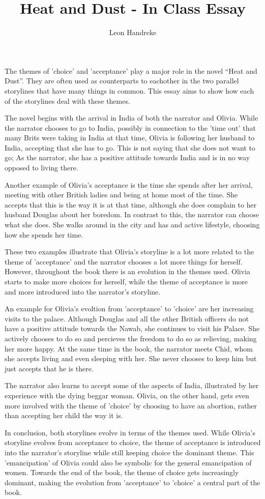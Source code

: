 \documentclass[11pt]{article}
\title{Heat and Dust - In Class Essay}
\author{Leon Handreke}
\date{}                                           %
\begin{document}
\doublespacing

\maketitle
{}\selectfont

The themes of 'choice' and 'acceptance' play a major role in the novel ``Heat and Dust''. They are often used as counterparts to eachother in the two parallel storylines that have many things in common. This essay aims to show how each of the storylines deal with these themes.

The novel begins with the arrival in India of both the narrator and Olivia. While the narrator chooses to go to India, possibly in connection to the 'time out' that many Brits were taking in India at that time, Olivia is following her husband to India, accepting that she has to go. This is not saying that she does not want to go; As the narrator, she has a positive attitude towards India and is in no way opposed to living there.

Another example of Olivia's acceptance is the time she spends after her arrival, meeting with other British ladies and being at home most of the time. She accepts that this is the way it is at that time, although she does complain to her husband Douglas about her boredom. In contrast to this, the narrator can choose what she does. She walks around in the city and has and active lifestyle, choosing how she spends her time.

These two examples illustrate that Olivia's storyline is a lot more related to the theme of 'acceptance' and the narrator chooses a lot more things for herself. However, throughout the book there is an evolution in the themes used. Olivia starts to make more choices for herself, while the theme of acceptance is more and more introduced into the narrator's storyline.

An example for Olivia's evoltion from 'acceptance' to 'choice' are her increasing visits to the palace. Although Douglas and all the other British officers do not have a positive attitude towards the Nawab, she continues to visit his Palace. She actively chooses to do so and percieves the freedom to do so as relieving, making her more happy. At the same time in the book, the narrator meets Chid, whom she accepts living and even sleeping with her. She never chooses to keep him but just accepts that he is there.

The narrator also learns to accept some of the aspects of India, illustrated by her experience with the dying beggar woman. Olivia, on the other hand, gets even more involved with the theme of 'choice' by choosing to have an abortion, rather than accepting her child the way it is.

In conclusion, both storylines evolve in terms of the themes used. While Olivia's storyline evolves from acceptance to choice, the theme of acceptance is introduced into the narrator's storyline while still keeping choice the dominant theme. This 'emancipation' of Olivia could also be symbolic for the general emancipation of women. Towards the end of the book, the theme of choice gets increasingly dominant, making the evolution from 'acceptance' to 'choice' a central part of the book.
\end{document}
